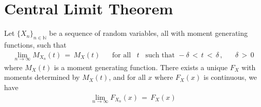 \section{Central Limit Theorem}

\begin{theorem}
    Let $\{X_{n}\}_{n \in \mathbb{N}}$ be a sequence of random variables, all with moment generating functions, such that
    \begin{align*}
        \lim_{n \longrightarrow \infty} M_{X_{n}}(t) \hspace{2pt} = \hspace{2pt} M_{X}(t) \hspace{20pt} \text{for all} \hspace{10pt} t \hspace{10pt} \text{such that} \hspace{4pt} -\delta \hspace{2pt} < \hspace{2pt} t \hspace{2pt} < \hspace{2pt} \delta \hspace{2pt} , \hspace{20pt} \delta \hspace{2pt} > \hspace{2pt} 0
    \end{align*}
    where $M_{X}(t)$ is a moment generating function. There exists a unique $F_{X}$ with moments determined by $M_{X}(t)$, and for all $x$ where $F_{X}(x)$ is continuous, we have
    \begin{align*}
        \lim_{n \longrightarrow \infty} F_{X_{n}}(x) \hspace{2pt} = \hspace{2pt} F_{X}(x)
    \end{align*}
\end{theorem}

